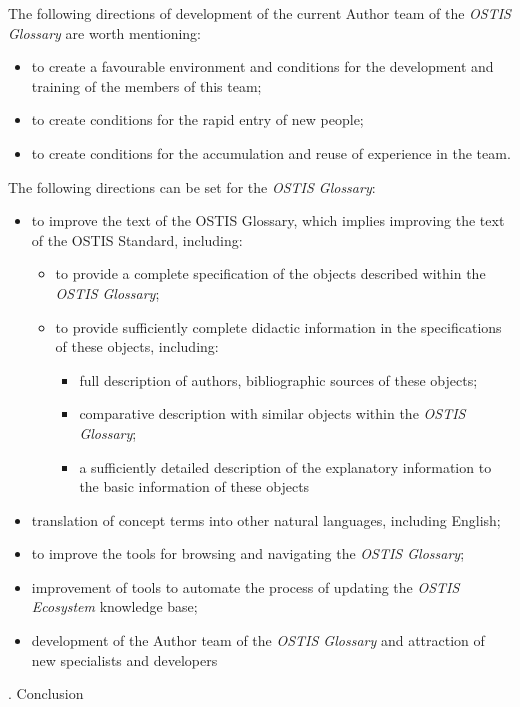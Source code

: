 \documentclass[12pt,a4paper]{scndocument}
\begin{document}
\begin{multicols}{2}
The following directions of development of the current
Author team of the \textit{OSTIS Glossary} are worth mentioning:
\begin{itemize}
    \item to create a favourable environment and conditions for the development and training of the members of this team;
    \item to create conditions for the rapid entry of new people;
    \item to create conditions for the accumulation and reuse of experience in the team.
\end{itemize}


The following directions can be set for the \textit{OSTIS Glossary}:
\begin{itemize}
    \item to improve the text of the OSTIS Glossary, which implies improving the text of the OSTIS Standard, including:
    \begin{itemize}
        \item to provide a complete specification of the objects described within the\textit{ OSTIS Glossary};
        \item to provide sufficiently complete didactic information in the specifications of these objects, including:
        \begin{itemize}
            \item full description of authors, bibliographic sources of these objects;
            \item comparative description with similar objects within the \textit{OSTIS Glossary};
            \item a sufficiently detailed description of the explanatory information to the basic information of these objects
        \end{itemize}
    \end{itemize}
    \item translation of concept terms into other natural languages, including English;
    \item to improve the tools for browsing and navigating the \textit{OSTIS Glossary};
    \item improvement of tools to automate the process of updating the \textit{OSTIS Ecosystem} knowledge base;
    \item development of the Author team of the \textit{OSTIS Glossary} and attraction of new specialists and developers
\end{itemize}
\begin{center}
    . Conclusion
\end{center}


\end{multicols}
\end{document}
